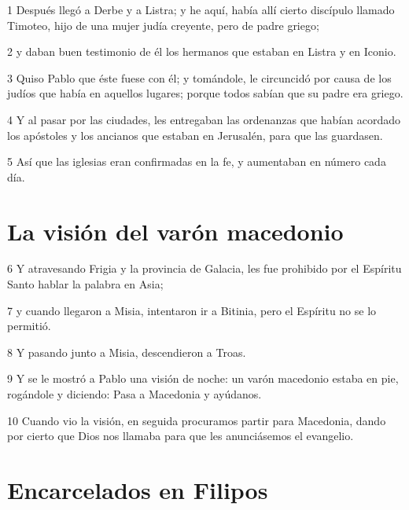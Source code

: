 \par 1 Después llegó a Derbe y a Listra; y he aquí, había allí cierto discípulo llamado Timoteo, hijo de una mujer judía creyente, pero de padre griego;
\par 2 y daban buen testimonio de él los hermanos que estaban en Listra y en Iconio.
\par 3 Quiso Pablo que éste fuese con él; y tomándole, le circuncidó por causa de los judíos que había en aquellos lugares; porque todos sabían que su padre era griego.
\par 4 Y al pasar por las ciudades, les entregaban las ordenanzas que habían acordado los apóstoles y los ancianos que estaban en Jerusalén, para que las guardasen.
\par 5 Así que las iglesias eran confirmadas en la fe, y aumentaban en número cada día.

\section*{La visión del varón macedonio}

\par 6 Y atravesando Frigia y la provincia de Galacia, les fue prohibido por el Espíritu Santo hablar la palabra en Asia;
\par 7 y cuando llegaron a Misia, intentaron ir a Bitinia, pero el Espíritu no se lo permitió.
\par 8 Y pasando junto a Misia, descendieron a Troas.
\par 9 Y se le mostró a Pablo una visión de noche: un varón macedonio estaba en pie, rogándole y diciendo: Pasa a Macedonia y ayúdanos.
\par 10 Cuando vio la visión, en seguida procuramos partir para Macedonia, dando por cierto que Dios nos llamaba para que les anunciásemos el evangelio.

\section*{Encarcelados en Filipos}

